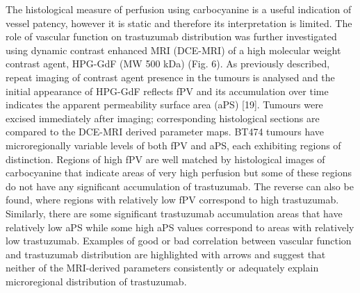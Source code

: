 The histological measure of perfusion using carbocyanine is a useful indication of vessel patency, however it is static and therefore its interpretation is limited.
The role of vascular function on trastuzumab distribution was further investigated using dynamic contrast enhanced MRI (DCE-MRI) of a high molecular weight contrast agent, \ac{HPG-GdF} (MW 500 kDa) (Fig.
6).
As previously described, repeat imaging of contrast agent presence in the tumours is analysed and the initial appearance of \ac{HPG-GdF} reflects \ac{fPV} and its accumulation over time indicates the apparent permeability surface area (aPS) [19].
Tumours were excised immediately after imaging; corresponding histological sections are compared to the DCE-MRI derived parameter maps.
BT474 tumours have microregionally variable levels of both \ac{fPV} and \ac{aPS}, each exhibiting regions of distinction.
Regions of high \ac{fPV} are well matched by histological images of carbocyanine that indicate areas of very high perfusion but some of these regions do not have any significant accumulation of trastuzumab.
The reverse can also be found, where regions with relatively low \ac{fPV} correspond to high trastuzumab.
Similarly, there are some significant trastuzumab accumulation areas that have relatively low \ac{aPS} while some high \ac{aPS} values correspond to areas with relatively low trastuzumab.
Examples of good or bad correlation between vascular function and trastuzumab distribution are highlighted with arrows and suggest that neither of the MRI-derived parameters consistently or adequately explain microregional distribution of trastuzumab.

